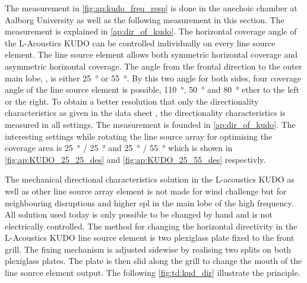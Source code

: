 
The measurement in \autoref{fig:ap:kudo_freq_resp} is done in the anechoic chamber at Aalborg University as well as the following measurement in this section. The measurement is explained in \autoref{ap:dir_of_kudo}. The horizontal coverage angle of the L-Acoustics KUDO can be controlled individually on every line source element. The line source element allows both symmetric horizontal coverage and asymmetric horizontal coverage. The angle from the frontal direction to the outer main lobe, , is either \SI{25}{\degree} or \SI{55}{\degree}. By this two angle for both sides, four coverage angle of the line source element is possible, \SI{110}{\degree}, \SI{50}{\degree} and \SI{80}{\degree} ether to the left or the right. To obtain a better resolution that only the  directionality characteristics as given in the data sheet \citep{KUDO_manual}, the directionality characteristics is measured in all settings. The measurement is founded in \autoref{ap:dir_of_kudo}. The interesting settings while rotating the line source array for optimising the coverage area is \SI{25}{\degree} / \SI{25}{\degree} and \SI{25}{\degree} / \SI{55}{\degree} which is shown in \autoref{fig:ap:KUDO_25_25_des} and \autoref{fig:ap:KUDO_25_55_des} respectivly.



The mechanical directional characteristics solution in the L-acoustics KUDO as well as other line source array element is not made for wind challenge but for neighbouring disruptions and higher \gls{spl} in the main lobe of the high frequency. All solution used today is only possible to be changed by hand and is not electrically controlled. The method for changing the horizontal directivity in the L-Acoustics KUDO line source element is two plexiglass plate fixed to the front grill. The fixing mechanism is adjusted sidewise by realising two splits on both plexiglass plates. The plate is then slid along the grill to change the mouth of the line source element output. The following \autoref{fig:td:kud_dir} illustrate the principle.

